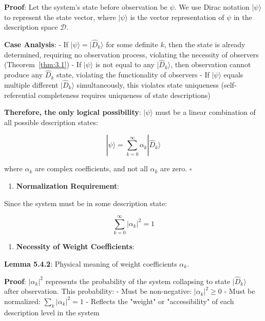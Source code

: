    \textbf{Proof}: Let the system's state before observation be $\psi$. We use Dirac notation $|\psi\rangle$ to represent the state vector, where $|\psi\rangle$ is the vector representation of $\psi$ in the description space $\mathcal{D}$.
   
   \textbf{Case Analysis}:
   - If $|\psi\rangle = |\hat{D}_k\rangle$ for some definite $k$, then the state is already determined, requiring no observation process, violating the necessity of observers (Theorem~\ref{thm:3.1})
   - If $|\psi\rangle$ is not equal to any $|\hat{D}_k\rangle$, then observation cannot produce any $\hat{D}_k$ state, violating the functionality of observers
   - If $|\psi\rangle$ equals multiple different $|\hat{D}_k\rangle$ simultaneously, this violates state uniqueness (self-referential completeness requires uniqueness of state descriptions)
   
   \textbf{Therefore, the only logical possibility}: $|\psi\rangle$ must be a linear combination of all possible description states:
   
\begin{equation}
|\psi\rangle = \sum_{k=0}^{\infty} \alpha_k |\hat{D}_k\rangle
\end{equation}
   
   where $\alpha_k$ are complex coefficients, and not all $\alpha_k$ are zero. $\square$

\begin{enumerate}
\item \textbf{Normalization Requirement}:
\end{enumerate}
   Since the system must be in some description state:
   
\begin{equation}
\sum_{k=0}^{\infty} |\alpha_k|^2 = 1
\end{equation}

\begin{enumerate}
\item \textbf{Necessity of Weight Coefficients}:
\end{enumerate}
   \textbf{Lemma 5.4.2}: Physical meaning of weight coefficients $\alpha_k$.
\label{thm:3.3}
   
   \textbf{Proof}: $|\alpha_k|^2$ represents the probability of the system collapsing to state $|\hat{D}_k\rangle$ after observation. This probability:
   - Must be non-negative: $|\alpha_k|^2 \geq 0$
   - Must be normalized: $\sum_k |\alpha_k|^2 = 1$
   - Reflects the "weight" or "accessibility" of each description level in the system
   
